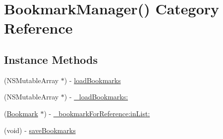 \hypertarget{category_bookmark_manager_07_08}{\section{Bookmark\-Manager() Category Reference}
\label{category_bookmark_manager_07_08}
}
\subsection*{Instance Methods}
\begin{DoxyCompactItemize}
\item 
(N\-S\-Mutable\-Array $\ast$) -\/ \hyperlink{category_bookmark_manager_07_08_a6f77622b5d1beab83ef656d3d2d87559}{load\-Bookmarks}
\item 
(N\-S\-Mutable\-Array $\ast$) -\/ \hyperlink{category_bookmark_manager_07_08_abd76887196549a6f588ad7183f367d7a}{\-\_\-load\-Bookmarks\-:}
\item 
(\hyperlink{interface_bookmark}{Bookmark} $\ast$) -\/ \hyperlink{category_bookmark_manager_07_08_a6c5a188409612e03ffc97535c6953cb8}{\-\_\-bookmark\-For\-Reference\-:in\-List\-:}
\item 
(void) -\/ \hyperlink{category_bookmark_manager_07_08_ad5be338bde1930fbb85ace7421d35736}{save\-Bookmarks}
\end{DoxyCompactItemize}


